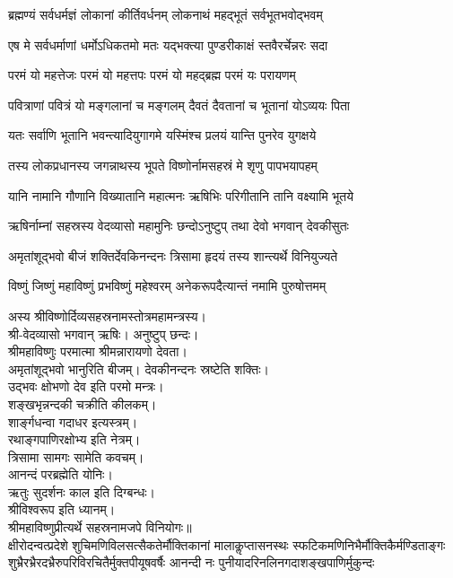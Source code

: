 \twolineshloka
{ब्रह्मण्यं सर्वधर्मज्ञं लोकानां कीर्तिवर्धनम्}
{लोकनाथं महद्भूतं सर्वभूतभवोद्भवम्}

\twolineshloka
{एष मे सर्वधर्माणां धर्मोऽधिकतमो मतः}
{यद्भक्त्या पुण्डरीकाक्षं स्तवैरर्चेन्नरः सदा}

\twolineshloka
{परमं यो महत्तेजः परमं यो महत्तपः}
{परमं यो महद्ब्रह्म परमं यः परायणम्}

\twolineshloka
{पवित्राणां पवित्रं यो मङ्गलानां च मङ्गलम्}
{दैवतं दैवतानां च भूतानां योऽव्ययः पिता}

\twolineshloka
{यतः सर्वाणि भूतानि भवन्त्यादियुगागमे}
{यस्मिंश्च प्रलयं यान्ति पुनरेव युगक्षये}

\twolineshloka
{तस्य लोकप्रधानस्य जगन्नाथस्य भूपते}
{विष्णोर्नामसहस्रं मे शृणु पापभयापहम्}

\twolineshloka
{यानि नामानि गौणानि विख्यातानि महात्मनः}
{ऋषिभिः परिगीतानि तानि वक्ष्यामि भूतये}

\twolineshloka
{ऋषिर्नाम्नां सहस्रस्य वेदव्यासो महामुनिः}
{छन्दोऽनुष्टुप् तथा देवो भगवान् देवकीसुतः}

\twolineshloka
{अमृतांशूद्भवो बीजं शक्तिर्देवकिनन्दनः}
{त्रिसामा हृदयं तस्य शान्त्यर्थे विनियुज्यते}

\twolineshloka
{विष्णुं जिष्णुं महाविष्णुं प्रभविष्णुं महेश्वरम्}
{अनेकरूपदैत्यान्तं नमामि पुरुषोत्तमम्}

अस्य श्रीविष्णोर्दिव्यसहस्रनामस्तोत्रमहामन्त्रस्य।\\
श्री-वेदव्यासो भगवान् ऋषिः। अनुष्टुप् छन्दः।\\
श्रीमहाविष्णुः परमात्मा श्रीमन्नारायणो देवता।\\
अमृतांशूद्भवो भानुरिति बीजम्। देवकीनन्दनः स्रष्टेति शक्तिः।\\
उद्भवः क्षोभणो देव इति परमो मन्त्रः।\\
शङ्खभृन्नन्दकी चक्रीति कीलकम्।\\
शार्ङ्गधन्वा गदाधर इत्यस्त्रम्। \\
रथाङ्गपाणिरक्षोभ्य इति नेत्रम्। \\
त्रिसामा सामगः सामेति कवचम्।\\
आनन्दं परब्रह्मेति योनिः।\\
ऋतुः सुदर्शनः काल इति दिग्बन्धः। \\
श्रीविश्वरूप इति ध्यानम्।\\
श्रीमहाविष्णुप्रीत्यर्थे सहस्रनामजपे विनियोगः॥\\

\resetShloka
\setlength{\shlokaspaceskip}{12pt}
\fourlineindentedshloka
{क्षीरोदन्वत्प्रदेशे शुचिमणिविलसत्सैकतेर्मौक्तिकानां}
{मालाकॢप्तासनस्थः स्फटिकमणिनिभैर्मौक्तिकैर्मण्डिताङ्गः}
{शुभ्रैरभ्रैरदभ्रैरुपरिविरचितैर्मुक्तपीयूषवर्षैः}
{आनन्दी नः पुनीयादरिनलिनगदाशङ्खपाणिर्मुकुन्दः}

